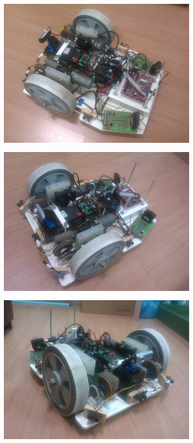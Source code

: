 \documentclass[oneside,a4paper,12pt]{normas-utf-tex}
\begin{document}
\begin{figure}[H]
	\centering
	\includegraphics[width=0.9\textwidth]{./figuras/robo/fotos/foto3.jpg}
	\label{fig:robo_foto3}
\end{figure}

\begin{figure}[H]
	\centering
	\includegraphics[width=0.9\textwidth]{./figuras/robo/fotos/foto4.jpg}
	\label{fig:robo_foto4}
\end{figure}

\begin{figure}[H]
	\centering
	\includegraphics[width=0.9\textwidth]{./figuras/robo/fotos/foto5.jpg}
	\label{fig:robo_foto5}
\end{figure}



\raggedright

\end{document}
